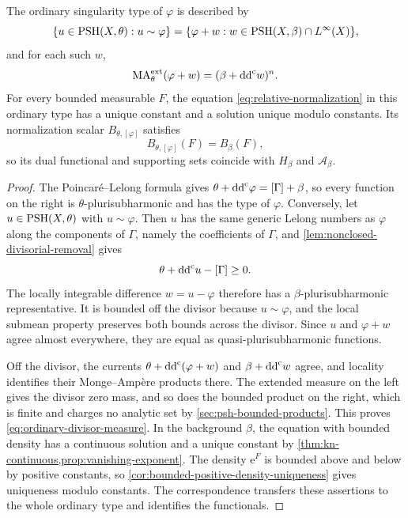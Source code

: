 \begin{theorem}\label{thm:ordinary-divisor-normalization}
The ordinary singularity type of $\varphi$ is described by
\[
 \{u\in\mathrm{PSH}(X,\theta):u\sim\varphi\}
 =\{\varphi+w:w\in\mathrm{PSH}(X,\beta)\cap L^\infty(X)\},
\]
and for each such $w$,
\begin{equation}\label{eq:ordinary-divisor-measure}
 \mathrm{MA}^{\mathrm{ext}}_\theta(\varphi+w)=(\beta+\mathrm{dd}^{\mathrm{c}} w)^n.
\end{equation}
For every bounded measurable $F$, the equation \eqref{eq:relative-normalization} in this ordinary type has a unique constant and a solution unique modulo constants. Its normalization scalar $B_{\theta,[\varphi]}$ satisfies
\[
 B_{\theta,[\varphi]}(F)=B_\beta(F),
\]
so its dual functional and supporting sets coincide with $H_\beta$ and $\mathcal A_\beta$.
\end{theorem}
\begin{proof}
The Poincar\'e--Lelong formula gives $\theta+\mathrm{dd}^{\mathrm{c}}\varphi=[\Gamma]+\beta$, so every function on the right is $\theta$-plurisubharmonic and has the type of $\varphi$. Conversely, let $u\in\mathrm{PSH}(X,\theta)$ with $u\sim\varphi$. Then $u$ has the same generic Lelong numbers as $\varphi$ along the components of $\Gamma$, namely the coefficients of $\Gamma$, and \cref{lem:nonclosed-divisorial-removal} gives
\[
 \theta+\mathrm{dd}^{\mathrm{c}} u-[\Gamma]\geq0.
\]
The locally integrable difference $w=u-\varphi$ therefore has a $\beta$-plurisubharmonic representative. It is bounded off the divisor because $u\sim\varphi$, and the local submean property preserves both bounds across the divisor. Since $u$ and $\varphi+w$ agree almost everywhere, they are equal as quasi-plurisubharmonic functions.

Off the divisor, the currents $\theta+\mathrm{dd}^{\mathrm{c}}(\varphi+w)$ and $\beta+\mathrm{dd}^{\mathrm{c}} w$ agree, and locality identifies their Monge--Amp\`ere products there. The extended measure on the left gives the divisor zero mass, and so does the bounded product on the right, which is finite and charges no analytic set by \cref{sec:psh-bounded-products}. This proves \eqref{eq:ordinary-divisor-measure}. In the background $\beta$, the equation with bounded density has a continuous solution and a unique constant by \cref{thm:kn-continuous,prop:vanishing-exponent}. The density $\mathrm{e}^F$ is bounded above and below by positive constants, so \cref{cor:bounded-positive-density-uniqueness} gives uniqueness modulo constants. The correspondence transfers these assertions to the whole ordinary type and identifies the functionals.
\end{proof}

